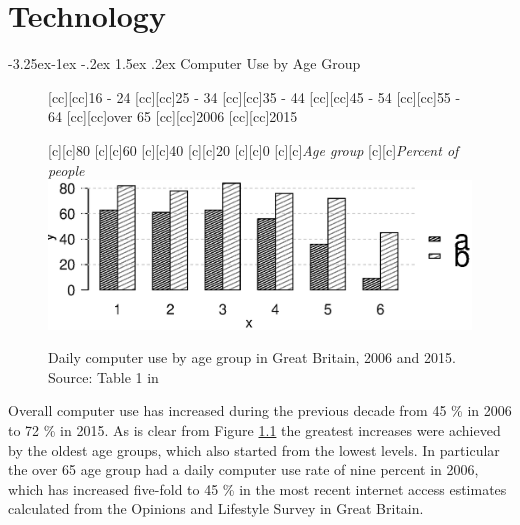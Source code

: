 \documentclass[11 pt, a4paper]{report}
\makeatletter
\renewcommand\subsection{\@startsection{subsection}{2}{\z@}%
                                     {-3.25ex\@plus -1ex \@minus -.2ex}%
                                     {1.5ex \@plus .2ex}%
    								{\large\scshape}}
\makeatother
\begin{document}
\clearpage

\chapter{Technology} %

\subsection{Computer Use by Age Group}


\begin{figure}[hbtp!]
[cc][cc]{\small{16 - 24}}
[cc][cc]{\small{25 - 34}}
[cc][cc]{\small{35 - 44}}
[cc][cc]{\small{45 - 54}}
[cc][cc]{\small{55 - 64}}
[cc][cc]{\small{over 65}}
[cc][cc]{\small{2006}}
[cc][cc]{\small{2015}}

[c][c]{\small{80}}
[c][c]{\small{60}}
[c][c]{\small{40}}
[c][c]{\small{20}}
[c][c]{\small{0}}
[c][c]{\small{\emph{Age group}}}
[c][c]{\small{\emph{Percent of people}}}
\includegraphics[width=\textwidth]{../figures/Fig7.1.eps}
\caption{Daily computer use by age group in Great Britain, 2006 and 2015. Source: Table 1 in \citet{ONS2015}}\label{Fig:19}%
\end{figure}

Overall computer use has increased during the previous decade from 45 \% in 2006 to 72 \% in 2015. As is clear from Figure \ref{Fig:19} the greatest increases were achieved by the oldest age groups, which also started from the lowest levels. In particular the over 65 age group had a daily computer use rate of nine percent in 2006, which has increased five-fold to 45 \% in the most recent internet access estimates calculated from the Opinions and Lifestyle Survey in Great Britain. 
\end{document}
